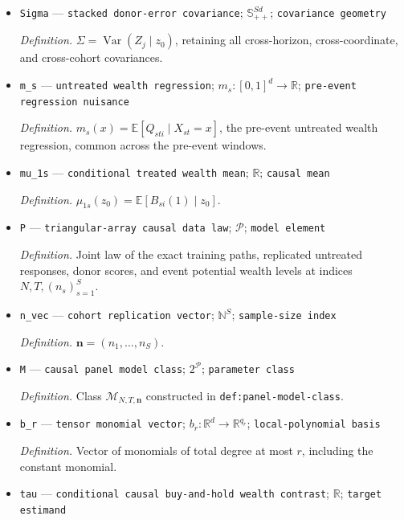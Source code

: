 \documentclass{article}
\begin{document}
\begin{itemize}
  \par\smallskip\noindent\emph{Definition.} \(\widehat z=N^{-1}\sum_{j=1}^{N}Z_j\).
  \item \texttt{Sigma} --- \texttt{stacked donor-\allowbreak{}error covariance}; \(\mathbb S_{++}^{Sd}\); \texttt{covariance geometry}
  \par\smallskip\noindent\emph{Definition.} \(\Sigma=\operatorname{Var}(Z_j\mid z_0)\), retaining all cross-horizon, cross-coordinate, and cross-cohort covariances.
  \item \texttt{m\_\allowbreak{}s} --- \texttt{untreated wealth regression}; \(m_s:[0,1]^d\to\mathbb R\); \texttt{pre-\allowbreak{}event regression nuisance}
  \par\smallskip\noindent\emph{Definition.} \(m_s(x)=\mathbb E[Q_{sti}\mid X_{st}=x]\), the pre-event untreated wealth regression, common across the pre-event windows.
  \item \texttt{mu\_\allowbreak{}1s} --- \texttt{conditional treated wealth mean}; \(\mathbb R\); \texttt{causal mean}
  \par\smallskip\noindent\emph{Definition.} \(\mu_{1s}(z_0)=\mathbb E[B_{si}(1)\mid z_0]\).
  \item \texttt{P} --- \texttt{triangular-\allowbreak{}array causal data law}; \(\mathcal P\); \texttt{model element}
  \par\smallskip\noindent\emph{Definition.} Joint law of the exact training paths, replicated untreated responses, donor scores, and event potential wealth levels at indices \(N,T,(n_s)_{s=1}^{S}\).
  \item \texttt{n\_\allowbreak{}vec} --- \texttt{cohort replication vector}; \(\mathbb N^S\); \texttt{sample-\allowbreak{}size index}
  \par\smallskip\noindent\emph{Definition.} \(\mathbf n=(n_1,\ldots,n_S)\).
  \item \texttt{M} --- \texttt{causal panel model class}; \(2^{\mathcal P}\); \texttt{parameter class}
  \par\smallskip\noindent\emph{Definition.} Class \(\mathcal M_{N,T,\mathbf n}\) constructed in \texttt{def:panel-model-class}.
  \item \texttt{b\_\allowbreak{}r} --- \texttt{tensor monomial vector}; \(b_r:\mathbb R^d\to\mathbb R^{q_r}\); \texttt{local-\allowbreak{}polynomial basis}
  \par\smallskip\noindent\emph{Definition.} Vector of monomials of total degree at most \(r\), including the constant monomial.
  \item \texttt{tau} --- \texttt{conditional causal buy-\allowbreak{}and-\allowbreak{}hold wealth contrast}; \(\mathbb R\); \texttt{target estimand}

\end{itemize}
\end{document}
